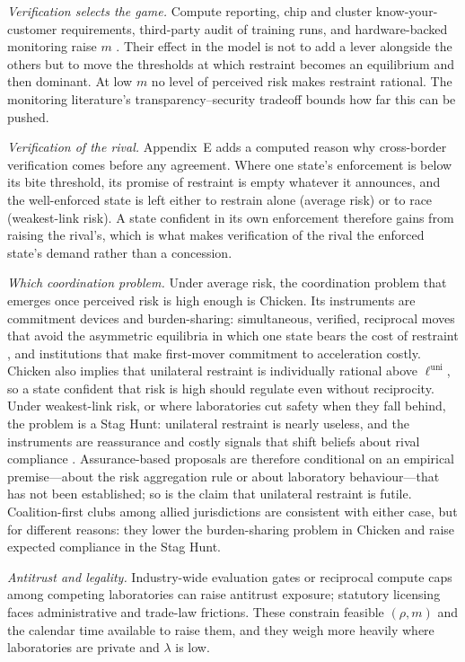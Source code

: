 \documentclass[11pt]{article}
\theoremstyle{plain}
\theoremstyle{definition}
\theoremstyle{remark}
\begin{document}
\emph{Verification selects the game.} Compute reporting, chip and cluster know-your-customer requirements, third-party audit of training runs, and hardware-backed monitoring raise $m$ \citep{shavit2023,sastry2024,baker2023}. Their effect in the model is not to add a lever alongside the others but to move the thresholds at which restraint becomes an equilibrium and then dominant. At low $m$ no level of perceived risk makes restraint rational. The monitoring literature's transparency--security tradeoff bounds how far this can be pushed.

\emph{Verification of the rival.} Appendix~E adds a computed reason why cross-border verification comes before any agreement. Where one state's enforcement is below its bite threshold, its promise of restraint is empty whatever it announces, and the well-enforced state is left either to restrain alone (average risk) or to race (weakest-link risk). A state confident in its own enforcement therefore gains from raising the rival's, which is what makes verification of the rival the enforced state's demand rather than a concession.

\emph{Which coordination problem.} Under average risk, the coordination problem that emerges once perceived risk is high enough is Chicken. Its instruments are commitment devices and burden-sharing: simultaneous, verified, reciprocal moves that avoid the asymmetric equilibria in which one state bears the cost of restraint \citep{schelling1960}, and institutions that make first-mover commitment to acceleration costly. Chicken also implies that unilateral restraint is individually rational above $\ell^{\mathrm{uni}}$, so a state confident that risk is high should regulate even without reciprocity. Under weakest-link risk, or where laboratories cut safety when they fall behind, the problem is a Stag Hunt: unilateral restraint is nearly useless, and the instruments are reassurance and costly signals that shift beliefs about rival compliance \citep{kydd2000}. Assurance-based proposals are therefore conditional on an empirical premise---about the risk aggregation rule or about laboratory behaviour---that has not been established; so is the claim that unilateral restraint is futile. Coalition-first clubs among allied jurisdictions \citep{schelling1961} are consistent with either case, but for different reasons: they lower the burden-sharing problem in Chicken and raise expected compliance in the Stag Hunt.

\emph{Antitrust and legality.} Industry-wide evaluation gates or reciprocal compute caps among competing laboratories can raise antitrust exposure; statutory licensing faces administrative and trade-law frictions. These constrain feasible $(\rho,m)$ and the calendar time available to raise them, and they weigh more heavily where laboratories are private and $\lambda$ is low.
\end{document}
